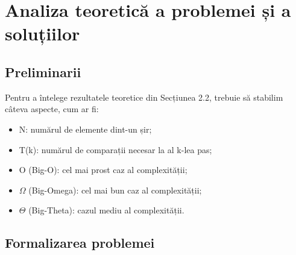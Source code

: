 \documentclass[12pt]{article}
\begin{document}
\section{Analiza teoretică a problemei și a soluțiilor}

\subsection{Preliminarii}
Pentru a întelege rezultatele teoretice din Secțiunea 2.2, trebuie să stabilim câteva aspecte, cum ar fi:
\begin{itemize}
    \item{N:} numărul de elemente dint-un șir;
    \item{T(k):} numărul de comparații necesar la al k-lea pas;
    \item{O (Big-O):} cel mai prost caz al complexității;
    \item{$\Omega$ (Big-Omega):} cel mai bun caz al complexității;
    \item{$\Theta$ (Big-Theta):} cazul mediu al complexității.
\end{itemize}

\label{sec:formala}
\subsection{Formalizarea problemei}
\end{document}
